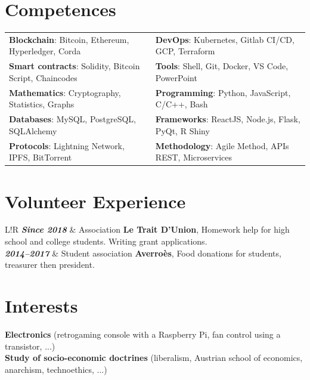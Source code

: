 \documentclass[10pt]{article}
\newcommand\VRule{\color{lightgray}\vrule width 2pt}
\begin{document}
\section*{Competences}
\begin{tabular}{ l l }
\textbf{Blockchain}: Bitcoin, Ethereum, Hyperledger, Corda & \textbf{DevOps}: Kubernetes, Gitlab CI/CD, GCP, Terraform \\[0.1cm]
\textbf{Smart contracts}: Solidity, Bitcoin Script, Chaincodes & \textbf{Tools}: Shell, Git, Docker, VS Code, PowerPoint \\[0.1cm]
\textbf{Mathematics}: Cryptography, Statistics, Graphs & \textbf{Programming}: Python, JavaScript, C/C++, Bash  \\[0.1cm]
\textbf{Databases}: MySQL, PostgreSQL, SQLAlchemy & \textbf{Frameworks}: ReactJS, Node.js, Flask, PyQt, R Shiny \\[0.1cm]
\textbf{Protocols}: Lightning Network, IPFS, BitTorrent & \textbf{Methodology}: Agile Method, APIs REST, Microservices \\[0.1cm]
\end{tabular}

\section*{Volunteer Experience}
\begin{tabular}{L!{\VRule}R}
\textbf{\textit{Since 2018}} & Association \textbf{Le Trait D’Union}, Homework help for high school and college students. Writing grant applications. \\[0.75cm]

\textbf{\textit{2014--2017}} & Student association \textbf{Averroès}, Food donations for students, treasurer then president. \\
\end{tabular}
\section*{Interests}
\hspace*{1ex} \textbf{Electronics} (retrogaming console with a Raspberry Pi, fan control using a transistor, ...) \\
\hspace*{1ex} \textbf{Study of socio-economic doctrines} (liberalism, Austrian school of economics, anarchism, technoethics, ...) \\
\end{document}
